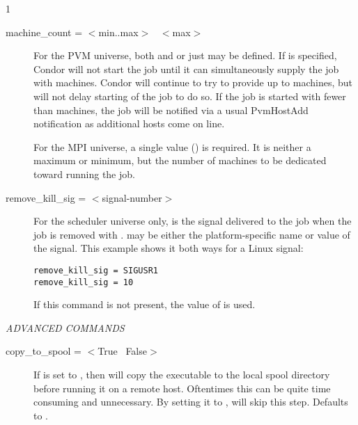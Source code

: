 \begin{ManPage}{\label{man-condor-submit}}{1}
\begin{description}

\item[machine\_count = $<$min..max$>$ \Bar\ $<$max$>$] 
For the PVM universe,
both  and  or just
 may be defined. 
If  is
specified, Condor will not start the job until it can simultaneously
supply the job with  machines.  Condor will continue to try 
to provide up
to  machines, but will not delay starting of the job to do so.
If the job is started with fewer than  machines, the job
will be notified via a usual PvmHostAdd notification as additional
hosts come on line.

For the MPI universe, a single value () is required.
It is neither a maximum or minimum, but 
the number of machines to be dedicated toward running the job.


\item[remove\_kill\_sig = $<$signal-number$>$] For the scheduler universe only,
 is the signal delivered
to the job when the job is removed
with .
 may be either the platform-specific name or value
of the signal.
This example shows it both ways for a Linux signal:
\begin{verbatim}
remove_kill_sig = SIGUSR1
remove_kill_sig = 10
\end{verbatim}
If this command is not present,
the value of  is used.

\end{description} 

\emph{ADVANCED COMMANDS}
\begin{description} 


\item[copy\_to\_spool = $<$True \Bar\ False$>$] If  is set to
, then  will copy the executable to the local spool 
directory before running it on a remote host. Oftentimes this can be quite
time consuming and unnecessary. By setting it to , 
will skip this step.  Defaults to .


\end{description}
\end{ManPage}
